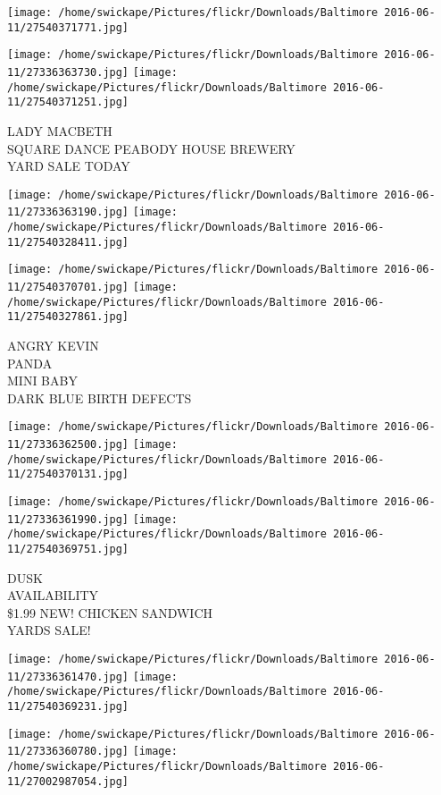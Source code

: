\documentclass[10pt,letterpaper]{article}
\begin{document}
\texttt{[image: /home/swickape/Pictures/flickr/Downloads/Baltimore 2016-06-11/27540371771.jpg]}

\vspace{0.25in}
\texttt{[image: /home/swickape/Pictures/flickr/Downloads/Baltimore 2016-06-11/27336363730.jpg]}
\texttt{[image: /home/swickape/Pictures/flickr/Downloads/Baltimore 2016-06-11/27540371251.jpg]}

LADY MACBETH\\
SQUARE DANCE PEABODY HOUSE BREWERY\\
YARD SALE TODAY
\pagebreak

\texttt{[image: /home/swickape/Pictures/flickr/Downloads/Baltimore 2016-06-11/27336363190.jpg]}
\texttt{[image: /home/swickape/Pictures/flickr/Downloads/Baltimore 2016-06-11/27540328411.jpg]}

\texttt{[image: /home/swickape/Pictures/flickr/Downloads/Baltimore 2016-06-11/27540370701.jpg]}
\texttt{[image: /home/swickape/Pictures/flickr/Downloads/Baltimore 2016-06-11/27540327861.jpg]}

ANGRY KEVIN\\
PANDA\\
MINI BABY\\
DARK BLUE BIRTH DEFECTS
\pagebreak

\texttt{[image: /home/swickape/Pictures/flickr/Downloads/Baltimore 2016-06-11/27336362500.jpg]}
\texttt{[image: /home/swickape/Pictures/flickr/Downloads/Baltimore 2016-06-11/27540370131.jpg]}

\texttt{[image: /home/swickape/Pictures/flickr/Downloads/Baltimore 2016-06-11/27336361990.jpg]}
\texttt{[image: /home/swickape/Pictures/flickr/Downloads/Baltimore 2016-06-11/27540369751.jpg]}

DUSK\\
AVAILABILITY\\
\$1.99 NEW!  CHICKEN SANDWICH\\
YARDS SALE!
\pagebreak

\texttt{[image: /home/swickape/Pictures/flickr/Downloads/Baltimore 2016-06-11/27336361470.jpg]}
\texttt{[image: /home/swickape/Pictures/flickr/Downloads/Baltimore 2016-06-11/27540369231.jpg]}

\texttt{[image: /home/swickape/Pictures/flickr/Downloads/Baltimore 2016-06-11/27336360780.jpg]}
\texttt{[image: /home/swickape/Pictures/flickr/Downloads/Baltimore 2016-06-11/27002987054.jpg]}
\end{document}
